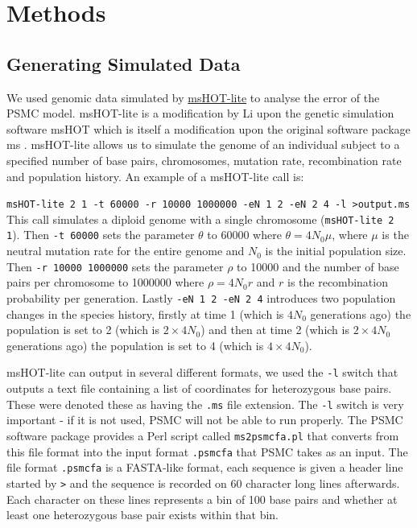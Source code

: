 \documentclass[11pt,a4paper]{article}
\begin{document}
\section{Methods}\label{sec:methods}
\subsection{Generating Simulated Data} %
We used genomic data simulated by \href{https://github.com/lh3/foreign/tree/master/msHOT-lite}{msHOT-lite} to analyse the error of the PSMC model. msHOT-lite is a modification by Li upon the genetic simulation software msHOT \cite{hellenthal2007mshot} which is itself a modification upon the original software package ms \cite{hudson2002generating}. msHOT-lite allows us to simulate the genome of an individual subject to a specified number of base pairs, chromosomes, mutation rate, recombination rate and population history. 
An example of a msHOT-lite call is: 

\verb|msHOT-lite 2 1 -t 60000 -r 10000 1000000 -eN 1 2 -eN 2 4 -l >output.ms| 
This call simulates a diploid genome with a single chromosome (\verb|msHOT-lite 2 1|). Then \verb|-t 60000| sets the parameter $\theta$ to 60000 where $\theta=4N_0\mu$, where $\mu$ is the neutral mutation rate for the entire genome and $N_0$ is the initial population size. Then \verb|-r 10000 1000000| sets the parameter $\rho$ to 10000 and the number of base pairs per chromosome to 1000000 where $\rho=4N_0r$ and $r$ is the recombination probability per generation. Lastly \verb|-eN 1 2 -eN 2 4| introduces two population changes in the species history, firstly at time 1 (which is $4N_0$ generations ago) the population is set to 2 (which is $2\times4N_0$) and then at time 2 (which is $2\times4N_0$ generations ago) the population is set to 4 (which is $4\times4N_0$).

msHOT-lite can output in several different formats, we used the \verb|-l| switch that outputs a text file containing a list of coordinates for heterozygous base pairs. These were denoted these as having the \verb|.ms| file extension. The \verb|-l| switch is very important - if it is not used, PSMC will not be able to run properly. The PSMC software package \cite{li2011inference} provides a Perl script called \verb|ms2psmcfa.pl| that converts from this file format into the input format \verb|.psmcfa| that PSMC takes as an input. The file format \verb|.psmcfa| is a FASTA-like format, each sequence is given a header line started by \verb|>| and the sequence is recorded on 60 character long lines afterwards. Each character on these lines represents a bin of 100 base pairs and whether at least one heterozygous base pair exists within that bin.
\end{document}
